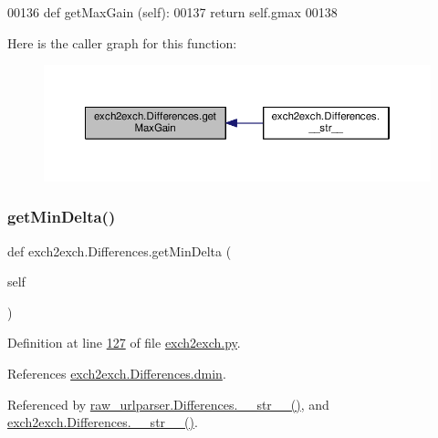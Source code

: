 \begin{DoxyCode}
00136     \textcolor{keyword}{def }getMaxGain (self): 
00137         \textcolor{keywordflow}{return} self.gmax
00138         
\end{DoxyCode}
Here is the caller graph for this function\+:
\nopagebreak
\begin{figure}[H]
\begin{center}
\leavevmode
\includegraphics[width=350pt]{classexch2exch_1_1_differences_a3b557469ba68c3041d6ef04dc847c77b_icgraph}
\end{center}
\end{figure}
\mbox{\label{classexch2exch_1_1_differences_ad2c60e37e0a390dd89be5d9388e552a4}} 
\subsubsection{\texorpdfstring{get\+Min\+Delta()}{getMinDelta()}}
{\footnotesize\ttfamily def exch2exch.\+Differences.\+get\+Min\+Delta (\begin{DoxyParamCaption}\item[{}]{self }\end{DoxyParamCaption})}



Definition at line \hyperlink{exch2exch_8py_source_l00127}{127} of file \hyperlink{exch2exch_8py_source}{exch2exch.\+py}.



References \hyperlink{exch2exch_8py_source_l00116}{exch2exch.\+Differences.\+dmin}.



Referenced by \hyperlink{raw__urlparser_8py_source_l00100}{raw\+\_\+urlparser.\+Differences.\+\_\+\+\_\+str\+\_\+\+\_\+()}, and \hyperlink{exch2exch_8py_source_l00154}{exch2exch.\+Differences.\+\_\+\+\_\+str\+\_\+\+\_\+()}.


